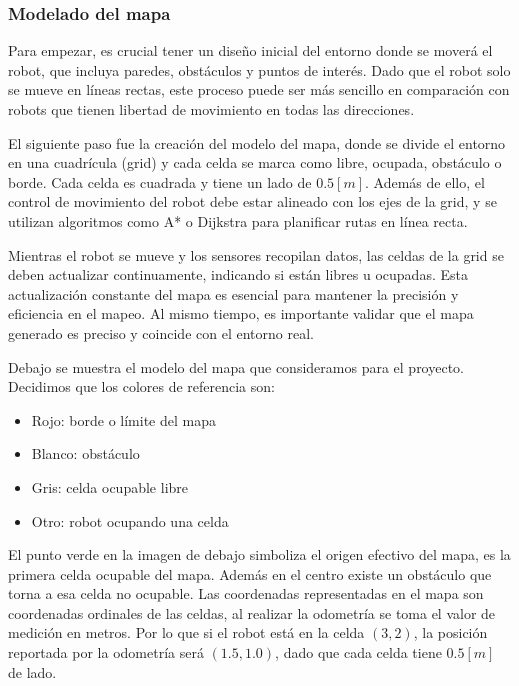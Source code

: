 \subsubsection{Modelado del mapa}

Para empezar, es crucial tener un diseño inicial del entorno donde se moverá el robot, que incluya paredes, obstáculos y puntos de interés. Dado que el robot solo se mueve en líneas rectas, este proceso puede ser más sencillo en comparación con robots que tienen libertad de movimiento en todas las direcciones.

El siguiente paso fue la creación del modelo del mapa, donde se divide el entorno en una cuadrícula (grid) y cada celda se marca como libre, ocupada, obstáculo o borde. Cada celda es cuadrada y tiene un lado de $0.5[m]$. Además de ello, el control de movimiento del robot debe estar alineado con los ejes de la grid, y se utilizan algoritmos como A* o Dijkstra para planificar rutas en línea recta.

Mientras el robot se mueve y los sensores recopilan datos, las celdas de la grid se deben actualizar continuamente, indicando si están libres u ocupadas. Esta actualización constante del mapa es esencial para mantener la precisión y eficiencia en el mapeo. Al mismo tiempo, es importante validar que el mapa generado es preciso y coincide con el entorno real.

Debajo se muestra el modelo del mapa que consideramos para el proyecto. Decidimos que los colores de referencia son:

\begin{itemize}
    \item Rojo: borde o límite del mapa
    \item Blanco: obstáculo
    \item Gris: celda ocupable libre
    \item Otro: robot ocupando una celda
\end{itemize}

El punto verde en la imagen de debajo simboliza el origen efectivo del mapa, es la primera celda ocupable del mapa. Además en el centro existe un obstáculo que torna a esa celda no ocupable. Las coordenadas representadas en el mapa son coordenadas ordinales de las celdas, al realizar la odometría se toma el valor de medición en metros. Por lo que si el robot está en la celda $(3, 2)$, la posición reportada por la odometría será $(1.5, 1.0)$, dado que cada celda tiene $0.5[m]$ de lado.

